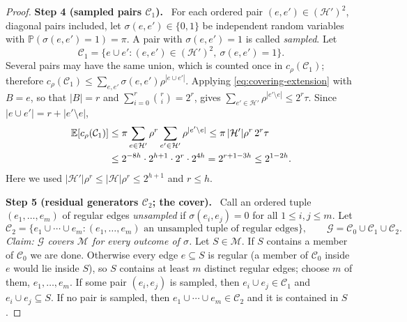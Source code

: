 \documentclass[11pt,letterpaper]{article}
\theoremstyle{definition}
\theoremstyle{remark}
\numberwithin{equation}{section}
\newcommand{\step}[1]{\par\medskip\noindent\textbf{#1}\ }
\begin{document}
\begin{proof}
\step{Step 4 (sampled pairs $\mathcal C_1$).}
For each ordered pair \((e,e')\in(\mathcal H')^2\), diagonal pairs
included, let $\sigma(e,e')\in\{0,1\}$ be independent random variables with
$\mathbb P(\sigma(e,e')=1)=\pi$. A pair with $\sigma(e,e')=1$ is called
\emph{sampled}. Let
\[
\mathcal C_1=\{e\cup e':(e,e')\in(\mathcal H')^2,\ \sigma(e,e')=1\}.
\]
Several pairs may have the same union, which is counted once in
$c_\rho(\mathcal C_1)$; therefore
$c_\rho(\mathcal C_1)\le\sum_{e,e'}\sigma(e,e')\rho^{|e\cup e'|}$.
Applying \eqref{eq:covering-extension} with \(B=e\), so that \(|B|=r\) and
$\sum_{i=0}^r\binom ri=2^r$, gives
$\sum_{e'\in\mathcal H'}\rho^{|e'\setminus e|}\le2^r\tau$. Since
$|e\cup e'|=r+|e'\setminus e|$,
\begin{align}
\mathbb E[c_\rho(\mathcal C_1)]
&\le\pi\sum_{e\in\mathcal H'}\rho^{r}
    \sum_{e'\in\mathcal H'}\rho^{|e'\setminus e|}
\le\pi\,|\mathcal H'|\rho^r\,2^r\tau
\notag\\
&\le2^{-8h}\cdot2^{h+1}\cdot2^{r}\cdot2^{4h}
=2^{r+1-3h}\le2^{1-2h}.
\label{eq:covering-pair-cost}
\end{align}
Here we used $|\mathcal H'|\rho^r\le|\mathcal H|\rho^r\le2^{h+1}$ and
$r\le h$.

\step{Step 5 (residual generators $\mathcal C_2$; the cover).}
Call an ordered tuple \((e_1,\ldots,e_m)\) of regular
edges \emph{unsampled} if $\sigma(e_i,e_j)=0$ for all $1\le i,j\le m$. Let
\[
\mathcal C_2=\{e_1\cup\cdots\cup e_m:
 (e_1,\ldots,e_m)\text{ an unsampled tuple of regular edges}\},
\qquad
\mathcal G=\mathcal C_0\cup\mathcal C_1\cup\mathcal C_2 .
\]
\emph{Claim: $\mathcal G$ covers $\mathcal M$ for every outcome of
$\sigma$.} Let $S\in\mathcal M$. If $S$ contains a member of
$\mathcal C_0$ we are done. Otherwise every edge $e\subseteq S$ is regular
(a member of $\mathcal C_0$ inside $e$ would lie inside $S$), so $S$
contains at least $m$ distinct regular edges; choose $m$ of them,
$e_1,\ldots,e_m$. If some pair $(e_i,e_j)$ is sampled, then
$e_i\cup e_j\in\mathcal C_1$ and $e_i\cup e_j\subseteq S$. If no pair is
sampled, then $e_1\cup\cdots\cup e_m\in\mathcal C_2$ and it is contained in
$S$.


\end{proof}
\end{document}
